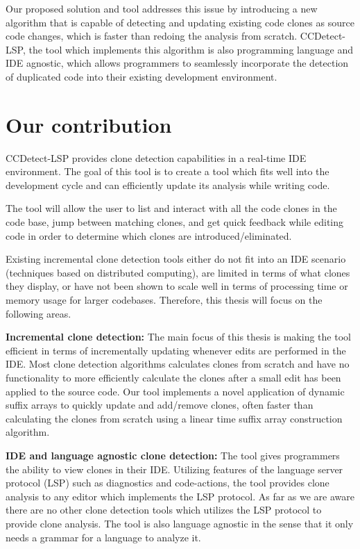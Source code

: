 Our proposed solution and tool addresses this issue by introducing a new algorithm that is
capable of detecting and updating existing code clones as source code changes, which is
faster than redoing the analysis from scratch. CCDetect-LSP, the tool which implements
this algorithm is also programming language and IDE agnostic, which allows programmers to
seamlessly incorporate the detection of duplicated code into their existing development
environment.

\section{Our contribution}

CCDetect-LSP provides clone detection capabilities in a real-time IDE environment. The
goal of this tool is to create a tool which fits well into the development cycle and can
efficiently update its analysis while writing code. 

The tool will allow the user to list and interact with all the code clones in the
code base, jump between matching clones, and get quick feedback while editing code in order
to determine which clones are introduced/eliminated.

Existing incremental clone detection tools either do not fit into an IDE scenario
(techniques based on distributed computing), are limited in terms of what clones they
display, or have not been shown to scale well in terms of processing time or memory usage
for larger codebases. Therefore, this thesis will focus on the following areas.

\textbf{Incremental clone detection:} The main focus of this thesis is making the tool
efficient in terms of incrementally updating whenever edits are performed in the IDE. Most
clone detection algorithms calculates clones from scratch and have no functionality to
more efficiently calculate the clones after a small edit has been applied to the source
code. Our tool implements a novel application of dynamic suffix arrays to quickly update
and add/remove clones, often faster than calculating the clones from scratch using a
linear time suffix array construction algorithm.

\textbf{IDE and language agnostic clone detection:} The tool gives programmers the ability
to view clones in their IDE. Utilizing features of the language server protocol (LSP) such
as diagnostics and code-actions, the tool provides clone analysis to any editor which
implements the LSP protocol. As far as we are aware there are no other clone detection
tools which utilizes the LSP protocol to provide clone analysis. The tool is also language
agnostic in the sense that it only needs a grammar for a language to analyze it.

